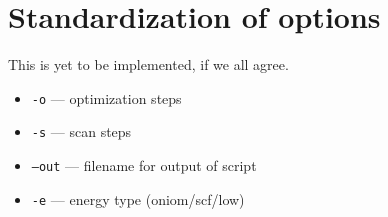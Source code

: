\documentclass[11pt,a4paper]{article}
\begin{document}
\section{Standardization of options}

This is yet to be implemented, if we all agree.

\begin{itemize}
    \item \texttt{-o} --- optimization steps
    \item \texttt{-s} --- scan steps
    \item \texttt{--out} --- filename for output of script
    \item \texttt{-e} --- energy type (oniom/scf/low)
    
\end{itemize}

%
%
%
%
%
\end{document}
